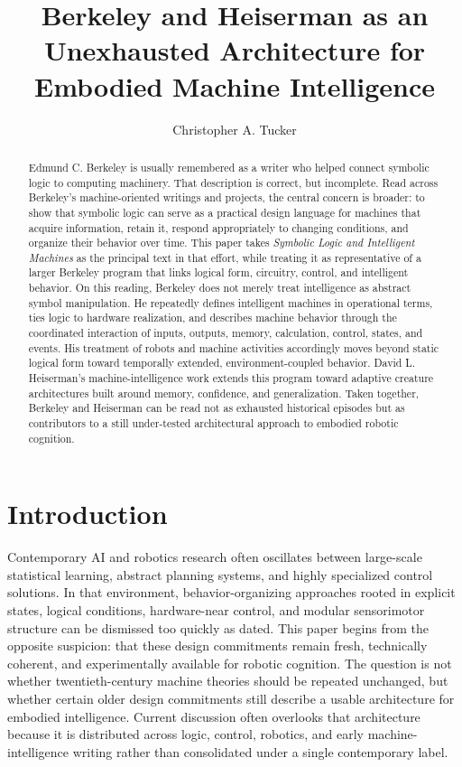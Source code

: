 \documentclass[11pt]{article}
\title{Berkeley and Heiserman as an Unexhausted Architecture for\\
Embodied Machine Intelligence}
\author{Christopher A. Tucker}
\date{}
\begin{document}
\maketitle

\begin{abstract}
Edmund C. Berkeley is usually remembered as a writer who helped connect symbolic logic to computing machinery. That description is correct, but incomplete. Read across Berkeley's machine-oriented writings and projects, the central concern is broader: to show that symbolic logic can serve as a practical design language for machines that acquire information, retain it, respond appropriately to changing conditions, and organize their behavior over time. This paper takes \emph{Symbolic Logic and Intelligent Machines} as the principal text in that effort, while treating it as representative of a larger Berkeley program that links logical form, circuitry, control, and intelligent behavior. On this reading, Berkeley does not merely treat intelligence as abstract symbol manipulation. He repeatedly defines intelligent machines in operational terms, ties logic to hardware realization, and describes machine behavior through the coordinated interaction of inputs, outputs, memory, calculation, control, states, and events. His treatment of robots and machine activities accordingly moves beyond static logical form toward temporally extended, environment-coupled behavior. David L. Heiserman's machine-intelligence work extends this program toward adaptive creature architectures built around memory, confidence, and generalization. Taken together, Berkeley and Heiserman can be read not as exhausted historical episodes but as contributors to a still under-tested architectural approach to embodied robotic cognition.
\end{abstract}

\onehalfspacing

\section{Introduction}

Contemporary AI and robotics research often oscillates between large-scale statistical learning, abstract planning systems, and highly specialized control solutions. In that environment, behavior-organizing approaches rooted in explicit states, logical conditions, hardware-near control, and modular sensorimotor structure can be dismissed too quickly as dated. This paper begins from the opposite suspicion: that these design commitments remain fresh, technically coherent, and experimentally available for robotic cognition. The question is not whether twentieth-century machine theories should be repeated unchanged, but whether certain older design commitments still describe a usable architecture for embodied intelligence. Current discussion often overlooks that architecture because it is distributed across logic, control, robotics, and early machine-intelligence writing rather than consolidated under a single contemporary label.
\end{document}
